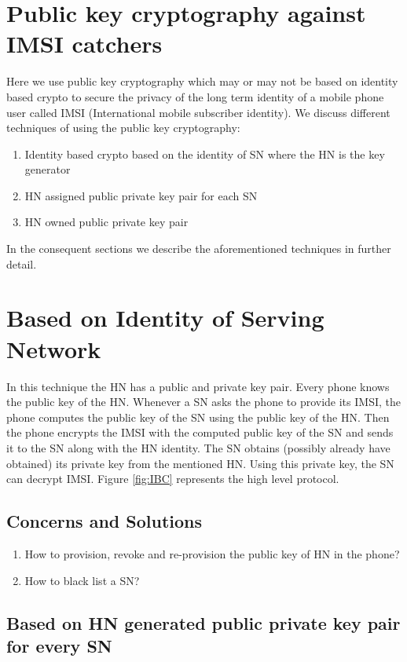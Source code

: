 \documentclass[lnicst,sechang,a4paper]{svmultln}
\begin{document}
\section{Public key cryptography against IMSI catchers}
Here we use public key cryptography which may or may not be based on identity based crypto to secure the privacy of the long term identity of a mobile phone user called IMSI (International mobile subscriber identity). We discuss different techniques of using the public key cryptography:

\begin{enumerate}
\item Identity based crypto based on the identity of SN where the HN is the key generator
\item HN assigned public private key pair for each SN
\item HN owned public private key pair
\end{enumerate}

In the consequent sections we describe the aforementioned techniques in further detail.

\section{Based on Identity of Serving Network} In this technique the HN has a public and private key pair. Every phone knows the public key of the HN. Whenever a SN asks the phone to provide its IMSI, the phone computes the public key of the SN using the public key of the HN. Then the phone encrypts the IMSI with the computed public key of the SN and sends it to the SN along with the HN identity. The SN obtains (possibly already have obtained) its private key from the mentioned HN. Using this private key, the SN can decrypt IMSI. Figure \ref{fig:IBC} represents the high level protocol.

\subsection{Concerns and Solutions}
\begin{enumerate}
\item How to provision, revoke and re-provision the public key of HN in the phone?
\item How to black list a SN?
\end{enumerate}

\subsection{Based on HN generated public private key pair for every SN}
\end{document}
